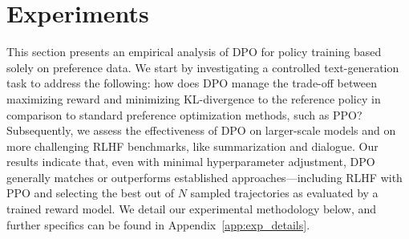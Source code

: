\section{Experiments}
This section presents an empirical analysis of DPO for policy training based solely on preference data. We start by investigating a controlled text-generation task to address the following: how does DPO manage the trade-off between maximizing reward and minimizing KL-divergence to the reference policy in comparison to standard preference optimization methods, such as PPO? Subsequently, we assess the effectiveness of DPO on larger-scale models and on more challenging RLHF benchmarks, like summarization and dialogue. Our results indicate that, even with minimal hyperparameter adjustment, DPO generally matches or outperforms established approaches—including RLHF with PPO and selecting the best out of $N$ sampled trajectories as evaluated by a trained reward model. We detail our experimental methodology below, and further specifics can be found in Appendix~\ref{app:exp_details}.

